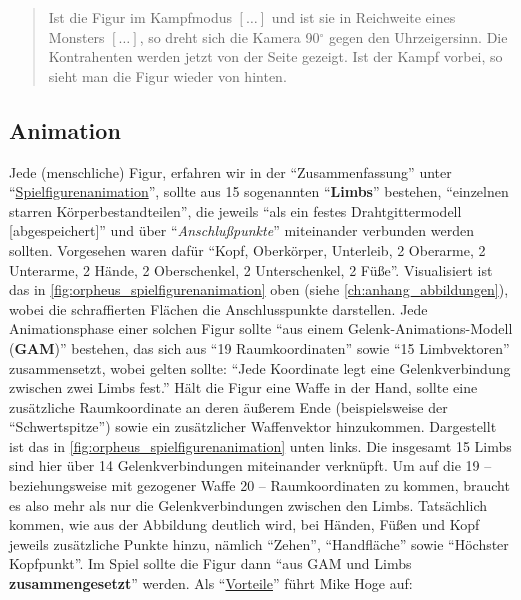 \documentclass[a5paper,pagesize,numbers=noenddot]{scrbook}
\begin{document}
\begin{quote}
Ist die Figur im Kampfmodus $[\dots]$ und ist sie in Reichweite eines Monsters $[\dots]$, so dreht sich die Kamera 90$^\circ$ gegen den Uhrzeigersinn. Die Kontrahenten werden jetzt von der Seite gezeigt.
Ist der Kampf vorbei, so sieht man die Figur wieder von hinten.
\end{quote}


\subsection{Animation}\label{sec:orpheus_darstellung_animation}
Jede (menschliche) Figur, erfahren wir in der \enquote{Zusammenfassung} unter \enquote{\uline{Spiel\-figurenanimation}}, sollte aus 15 sogenannten \enquote{\textbf{Limbs}} bestehen, \enquote{einzelnen starren Körperbestandteilen}, die jeweils \enquote{als ein festes Drahtgittermodell [abgespeichert]} und über \enquote{\textit{Anschlußpunkte}} miteinander verbunden werden sollten.
Vorgesehen waren dafür \enquote{Kopf, Oberkörper, Unterleib, 2 Oberarme, 2 Unterarme, 2 Hände, 2 Oberschenkel, 2 Unterschenkel, 2 Füße}.
Visualisiert ist das in \autoref{fig:orpheus_spielfigurenanimation} oben (siehe \autoref{ch:anhang_abbildungen}), wobei die schraffierten Flächen die Anschlusspunkte darstellen.
Jede Animationsphase einer solchen Figur sollte \enquote{aus einem Gelenk-Animations-Modell (\textbf{GAM})} bestehen, das sich aus \enquote{19 Raumkoordinaten} sowie \enquote{15 Limbvektoren} zusammensetzt, wobei gelten sollte: \enquote{Jede Koordinate legt eine Gelenkverbindung zwischen zwei Limbs fest.}
Hält die Figur eine Waffe in der Hand, sollte eine zusätzliche Raumkoordinate an deren äußerem Ende (beispielsweise der \enquote{Schwertspitze}) sowie ein zusätzlicher Waffenvektor hinzukommen.
Dargestellt ist das in \autoref{fig:orpheus_spielfigurenanimation} unten links.
Die insgesamt 15 Limbs sind hier über 14 Gelenkverbindungen miteinander verknüpft.
Um auf die 19 -- beziehungsweise mit gezogener Waffe 20 -- Raumkoordinaten zu kommen, braucht es also mehr als nur die Gelenkverbindungen zwischen den Limbs.
Tatsächlich kommen, wie aus der Abbildung deutlich wird, bei Händen, Füßen und Kopf jeweils zusätzliche Punkte hinzu, nämlich \enquote{Zehen}, \enquote{Handfläche} sowie \enquote{Höchster Kopfpunkt}.
Im Spiel sollte die Figur dann \enquote{aus GAM und Limbs \textbf{zusammengesetzt}} werden.
Als \enquote{\uline{Vorteile}} führt Mike Hoge auf:
\end{document}
